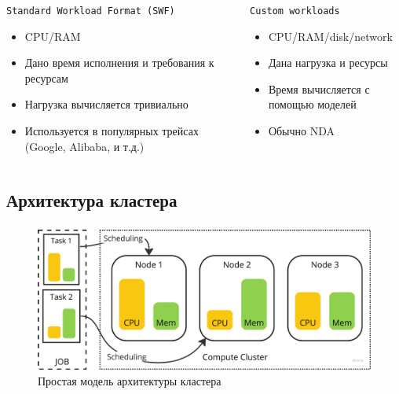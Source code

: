 \documentclass[t]{beamer}  %
\begin{document}
    \begin{frame}[fragile]
    \frametitle{\insertsection} 
	\framesubtitle{\insertsubsection}
	
			\vspace{0.5cm}
	\begin{columns}[t]
		\begin{column}{0.55\textwidth}
			{\centering \small\texttt{Standard Workload Format (SWF)}}
			\vspace{0.3cm}
			\begin{itemize}
				\item<1-> CPU/RAM 
				\item<2-> Дано время исполнения и требования к ресурсам
				\item<2-> Нагрузка вычисляется тривиально
				\item<3-> Используется в популярных трейсах (Google, Alibaba, и т.д.)

			\end{itemize}
						
		\end{column}
		\begin{column}{0.5\textwidth}
			{\centering  \small\texttt{Custom workloads}}
			\vspace{0.3cm}
			\begin{itemize}
				\item<1-> CPU/RAM/disk/network 
				\item<2-> Дана нагрузка и ресурсы
				\item<2-> Время вычисляется с помощью моделей
				\item<3-> Обычно NDA
			\end{itemize}
		\end{column}
	\end{columns}


    \end{frame}


	\subsection{Архитектура кластера}

	\begin{frame}[fragile]
    \frametitle{\insertsection} 
	\framesubtitle{\insertsubsection}
	\vspace{0.1cm}	
	\begin{figure}[H]
		\centering
			\includegraphics[width=\linewidth]{images/cluster}
			\vspace{0.1cm}
			\caption*{Простая модель архитектуры кластера}
		\end{figure}


	\end{frame}
\end{document}
